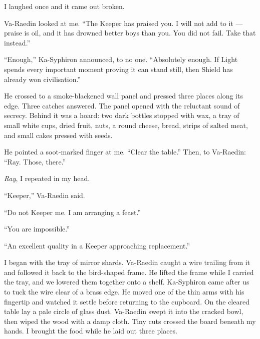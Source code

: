 I laughed once and it came out broken.\par

Va-Raedin looked at me. ``The Keeper has praised you. I will not add to it --- praise is oil, and it has drowned better boys than you. You did not fail. Take that instead.''\par

``Enough,'' Ka-Syphiron announced, to no one. ``Absolutely enough. If Light spends every important moment proving it can stand still, then Shield has already won civilisation.''\par

He crossed to a smoke-blackened wall panel and pressed three places along its edge. Three catches answered. The panel opened with the reluctant sound of secrecy. Behind it was a hoard: two dark bottles stopped with wax, a tray of small white cups, dried fruit, nuts, a round cheese, bread, strips of salted meat, and small cakes pressed with seeds.\par

He pointed a soot-marked finger at me. ``Clear the table.'' Then, to Va-Raedin: ``Ray. Those, there.''\par
\textit{Ray}, I repeated in my head.\par
``Keeper,'' Va-Raedin said.\par
``Do not Keeper me. I am arranging a feast.''\par
``You are impossible.''\par
``An excellent quality in a Keeper approaching replacement.''\par

I began with the tray of mirror shards. Va-Raedin caught a wire trailing from it and followed it back to the bird-shaped frame. He lifted the frame while I carried the tray, and we lowered them together onto a shelf. Ka-Syphiron came after us to tuck the wire clear of a brass edge. He moved one of the thin arms with his fingertip and watched it settle before returning to the cupboard. On the cleared table lay a pale circle of glass dust. Va-Raedin swept it into the cracked bowl, then wiped the wood with a damp cloth. Tiny cuts crossed the board beneath my hands. I brought the food while he laid out three places.\par

